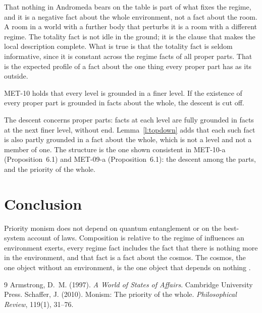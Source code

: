 \documentclass{situationist-preprint}
\begin{document}
\begin{reply}
That nothing in Andromeda bears on the table is part of what fixes the regime, and it is a negative fact about the whole environment, not a fact about the room. A room in a world with a further body that perturbs it is a room with a different regime. The totality fact is not idle in the ground; it is the clause that makes the local description complete. What is true is that the totality fact is seldom informative, since it is constant across the regime facts of all proper parts. That is the expected profile of a fact about the one thing every proper part has as its outside.
\end{reply}

\begin{objection}[Descent]
MET-10 holds that every level is grounded in a finer level. If the existence of every proper part is grounded in facts about the whole, the descent is cut off.
\end{objection}

\begin{reply}
The descent concerns proper parts: facts at each level are fully grounded in facts at the next finer level, without end. Lemma~\ref{l:topdown} adds that each such fact is also partly grounded in a fact about the whole, which is not a level and not a member of one. The structure is the one shown consistent in MET-10-a (Proposition~6.1) and MET-09-a (Proposition~6.1): the descent among the parts, and the priority of the whole.
\end{reply}

\section{Conclusion}

Priority monism does not depend on quantum entanglement or on the best-system account of laws. Composition is relative to the regime of influences an environment exerts, every regime fact includes the fact that there is nothing more in the environment, and that fact is a fact about the cosmos. The cosmos, the one object without an environment, is the one object that depends on nothing \citep{Schaffer2010}.

\begin{thebibliography}{9}\small
{} Armstrong, D.~M. (1997). \emph{A World of States of Affairs}. Cambridge University Press.
 Schaffer, J. (2010). Monism: The priority of the whole. \emph{Philosophical Review}, 119(1), 31--76.
\end{thebibliography}
\end{document}
